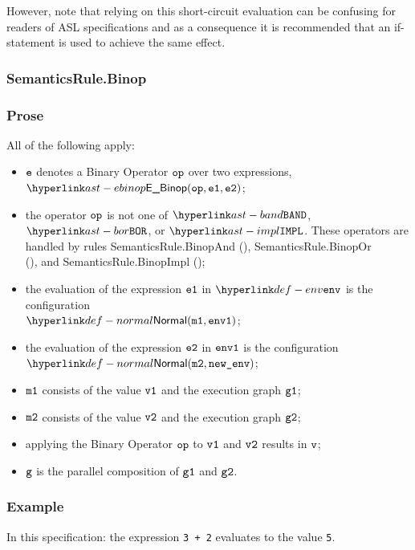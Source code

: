 However, note that relying on this short-circuit evaluation can be confusing
for readers of ASL specifications and as a consequence it is recommended that
an if-statement is used to achieve the same effect.

\subsubsection{SemanticsRule.Binop \label{sec:SemanticsRule.Binop}}
\subsubsection{Prose}
All of the following apply:
\begin{itemize}
  \item $\texttt{e}$ denotes a Binary Operator $\texttt{op}$ over two expressions, $\EBinop(\op, \veone, \vetwo)$;
  \item the operator $\texttt{op}$ is not one of $\BAND$, $\BOR$, or $\IMPL$.
        These operators are handled by rules
        SemanticsRule.BinopAnd (),
        SemanticsRule.BinopOr \\ (), and
        SemanticsRule.BinopImpl ();
  \item the evaluation of the expression $\texttt{e1}$ in $\env$ is the configuration \\
        $\Normal(\vmone, \envone)$\ProseOrAbnormal;
  \item the evaluation of the expression $\texttt{e2}$ in $\texttt{env1}$ is the configuration \\
        $\Normal(\vmtwo, \newenv)$\ProseOrAbnormal;
  \item $\texttt{m1}$ consists of the value $\texttt{v1}$ and the execution graph $\texttt{g1}$;
  \item $\texttt{m2}$ consists of the value $\texttt{v2}$ and the execution graph $\texttt{g2}$;
  \item applying the Binary Operator $\texttt{op}$ to $\texttt{v1}$ and $\texttt{v2}$ results in $\texttt{v}$\ProseOrError;
  \item $\texttt{g}$ is the parallel composition of $\texttt{g1}$ and $\texttt{g2}$.
\end{itemize}

\subsubsection{Example}
In this specification:
the expression \texttt{3 + 2} evaluates to the value \texttt{5}.

